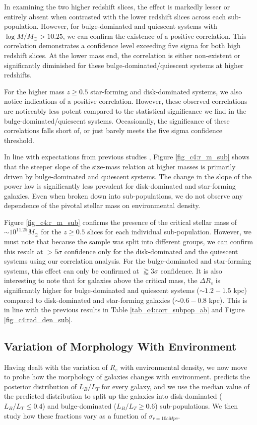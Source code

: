 In examining the two higher redshift slices, the effect is markedly lesser or entirely absent when contrasted with the lower redshift slices across each sub-population. However, for bulge-dominated and quiescent systems with $\log M/M_{\odot} > 10.25$, we can confirm the existence of a positive correlation. This correlation demonstrates a confidence level exceeding five sigma for both high redshift slices. At the lower mass end, the correlation is either non-existent or significantly diminished for these bulge-dominated/quiescent systems at higher redshifts.

For the higher mass $z \geq 0.5$ star-forming and disk-dominated systems, we also notice indications of a positive correlation. However, these observed correlations are noticeably less potent compared to the statistical significance we find in the bulge-dominated/quiescent systems. Occasionally, the significance of these correlations falls short of, or just barely meets the five sigma confidence threshold.

In line with expectations from previous studies \citep[e.g.,][]{mowla19, hsc_mass_size}, Figure \ref{fig_c4:r_m_sub} shows that the steeper slope of the size-mass relation at higher masses is primarily driven by bulge-dominated and quiescent systems. The change in the slope of the power law is significantly less prevalent for disk-dominated and star-forming galaxies. Even when broken down into sub-populations, we do not observe any dependence of the pivotal stellar mass on environmental density.

Figure \ref{fig_c4:r_m_sub} confirms the presence of the critical stellar mass of $\sim 10^{11.25}M_{\odot}$ for the $z \geq 0.5$ slices for each individual sub-population. However, we must note that because the sample was split into different groups, we can confirm this result at $>5\sigma$ confidence only for the disk-dominated and the quiescent systems using our correlation analysis. For the bulge-dominated and star-forming systems, this effect can only be confirmed at $\gtrapprox3\sigma$ confidence. It is also interesting to note that for galaxies above the critical mass, the $\Delta R_e$ is significantly higher for bulge-dominated and quiescent systems ($\sim1.2-1.5$ kpc) compared to disk-dominated and star-forming galaxies ($\sim0.6-0.8$ kpc). This is in line with the previous results in Table \ref{tab_c4:corr_subpop_ab} and Figure \ref{fig_c4:rad_den_sub}. 

\subsection{Variation of Morphology With Environment} \label{sec_c4:morph_env}
Having dealt with the variation of $R_e$ with environmental density, we now move to probe how the morphology of galaxies changes with environment. \gampen{} predicts the posterior distribution of $L_B/L_T$ for every galaxy, and we use the median value of the predicted distribution to split up the galaxies into disk-dominated ($L_B/L_T \leq 0.4$) and bulge-dominated ($L_B/L_T \geq 0.6$) sub-populations. We then study how these fractions vary as a function of $\sigma_{r=10cMpc}$.

